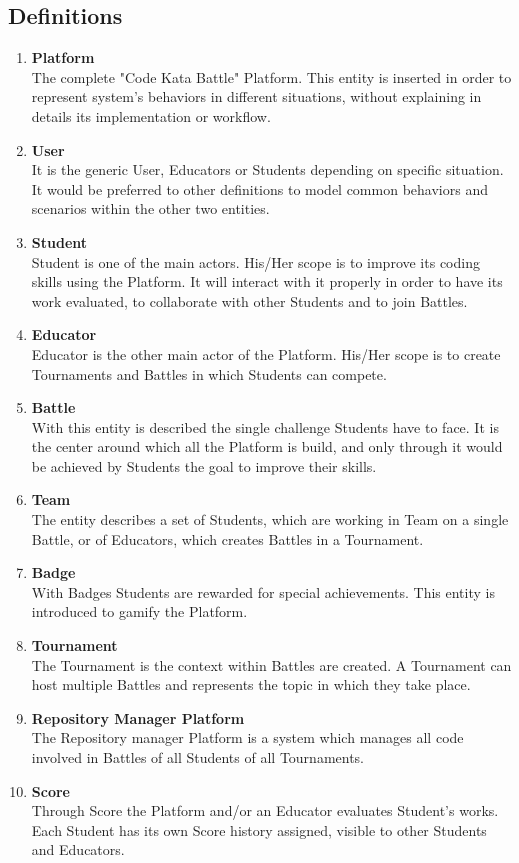 \subsection{Definitions}
\begin{enumerate}[label=$\bullet$]
    \item \textbf{Platform}\\The complete "Code Kata Battle" Platform. This entity is inserted in order to represent system's behaviors in different situations, without explaining in details its implementation or workflow.
    \item \textbf{User}\\It is the generic User, Educators or Students depending on specific situation. It would be preferred to other definitions to model common behaviors and scenarios within the other two entities.
    \item \textbf{Student}\\Student is one of the main actors. His/Her scope is to improve its coding skills using the Platform. It will interact with it properly in order to have its work evaluated, to collaborate with other Students and to join Battles.
    \item \textbf{Educator}\\Educator is the other main actor of the Platform. His/Her scope is to create Tournaments and Battles in which Students can compete.
    \item \textbf{Battle}\\With this entity is described the single challenge Students have to face. It is the center around which all the Platform is build, and only through it would be achieved by Students the goal to improve their skills.
    \item \textbf{Team}\\The entity describes a set of Students, which are working in Team on a single Battle, or of Educators, which creates Battles in a Tournament.
    \item \textbf{Badge}\\With Badges Students are rewarded for special achievements. This entity is introduced to gamify the Platform.
    \item \textbf{Tournament}\\The Tournament is the context within Battles are created. A Tournament can host multiple Battles and represents the topic in which they take place.
    \item \textbf{Repository Manager Platform}\\The Repository manager Platform is a system which manages all code involved in Battles of all Students of all Tournaments.
    \item \textbf{Score}\\Through Score the Platform and/or an Educator evaluates Student's works. Each Student has its own Score history assigned, visible to other Students and Educators.
\end{enumerate}
